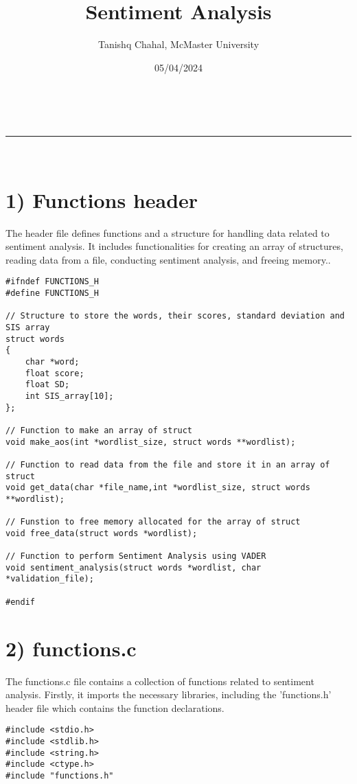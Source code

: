 \documentclass[a4paper,11pt]{article}
\makeatletter
\newcommand{\linia}{\rule{\linewidth}{0.5pt}}
\theoremstyle{mytheor}
\renewcommand{\maketitle}{
\begin{center}
\vspace{2ex}
{\huge \textsc{\@title}}
\vspace{1ex}
\\
\linia\\
\@author \hfill \@date
\vspace{4ex}
\end{center}
}
\makeatother
\begin{document}
\title{Sentiment Analysis}

\author{Tanishq Chahal, McMaster University}

\date{05/04/2024}

\maketitle

\section*{1) Functions header}

The header file defines functions and a structure for handling data related to sentiment analysis. It includes functionalities for creating an array of structures, reading data from a file, conducting sentiment analysis, and freeing memory..
\begin{lstlisting}[label={list:first},caption=functions.h]
#ifndef FUNCTIONS_H
#define FUNCTIONS_H

// Structure to store the words, their scores, standard deviation and SIS array
struct words
{
    char *word;
    float score;
    float SD;
    int SIS_array[10];
};

// Function to make an array of struct
void make_aos(int *wordlist_size, struct words **wordlist);

// Function to read data from the file and store it in an array of struct
void get_data(char *file_name,int *wordlist_size, struct words **wordlist);

// Funstion to free memory allocated for the array of struct
void free_data(struct words *wordlist);

// Function to perform Sentiment Analysis using VADER
void sentiment_analysis(struct words *wordlist, char *validation_file);

#endif
\end{lstlisting}

\section*{2) functions.c}
The functions.c file contains a collection of functions related to sentiment analysis. Firstly, it imports the necessary libraries, including the 'functions.h' header file which contains the function declarations.
\begin{lstlisting}[label={list:second},caption=function.c]
#include <stdio.h>
#include <stdlib.h>
#include <string.h>
#include <ctype.h>
#include "functions.h"
\end{lstlisting}
\end{document}
